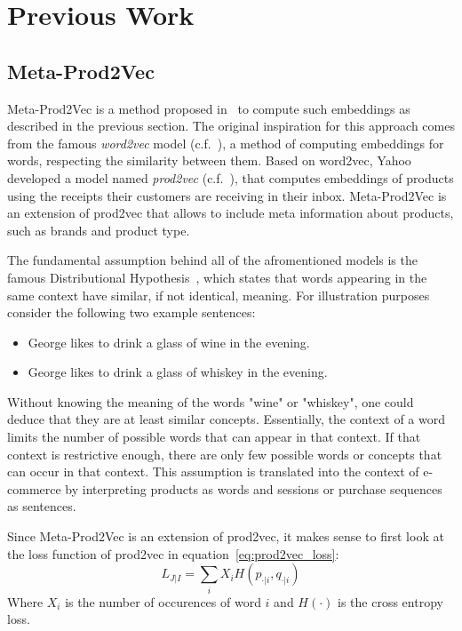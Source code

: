 \section{Previous Work}
\subsection{Meta-Prod2Vec}\label{sec:meta_prod2vec}
Meta-Prod2Vec is a method proposed in~\cite{meta_prod2vec} to compute such embeddings as described in the previous section.
The original inspiration for this approach comes from the famous \emph{word2vec} model (c.f.~\cite{word2vec}), a method of computing embeddings for words, respecting the similarity between them.
Based on word2vec, Yahoo developed a model named \emph{prod2vec} (c.f.~\cite{prod2vec}), that computes embeddings of products using the receipts their customers are receiving in their inbox.
Meta-Prod2Vec is an extension of prod2vec that allows to include meta information about products, such as brands and product type.
\par
The fundamental assumption behind all of the afromentioned models is the famous Distributional Hypothesis~\cite{distributional}, which states that words appearing in the same context have similar, if not identical, meaning.
For illustration purposes consider the following two example sentences:
\begin{itemize}
    \item George likes to drink a glass of wine in the evening.
    \item George likes to drink a glass of whiskey in the evening.
\end{itemize}
Without knowing the meaning of the words "wine" or "whiskey", one could deduce that they are at least similar concepts.
Essentially, the context of a word limits the number of possible words that can appear in that context.
If that context is restrictive enough, there are only few possible words or concepts that can occur in that context.
This assumption is translated into the context of e-commerce by interpreting products as words and sessions or purchase sequences as sentences.
\par
Since Meta-Prod2Vec is an extension of prod2vec, it makes sense to first look at the loss function of prod2vec in equation~\ref{eq:prod2vec_loss}:
\begin{equation}\label{eq:prod2vec_loss}
    L_{J|I} = \sum_i X_iH(p_{\cdot|i},q_{\cdot|i})
\end{equation}
Where $X_i$ is the number of occurences of word $i$ and $H(\cdot)$ is the cross entropy loss.
